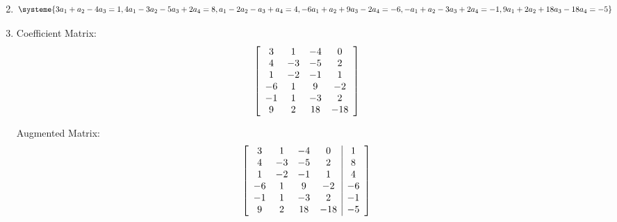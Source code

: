 \documentclass{article}
\begin{document}
\begin{enumerate}[label = \textbf{\alph*)}]
\begin{align*}
		\end{align*}
	\item
		\[
		\systeme{
			3a_1 + a_2 - 4a_3 = 1,
			4a_1 - 3a_2 - 5a_3 + 2a_4 = 8,
			a_1 - 2a_2 - a_3 + a_4 = 4,
			-6a_1 + a_2 + 9a_3 - 2a_4 = -6,
			-a_1 + a_2 - 3a_3 + 2a_4 = -1,
			9a_1 + 2a_2 + 18a_3 - 18a_4 = -5
		}
		\]
	\item
		Coefficient Matrix:
		\begin{align*}
			\left[
			\begin{array}{ c c c c }
				3 & 1 & -4 & 0 \\
				4 & -3 & -5 & 2 \\
				1 & -2 & -1 & 1 \\
				-6 & 1 & 9 & -2 \\
				-1 & 1 & -3 & 2 \\
				9 & 2 & 18 & -18
			\end{array}
			\right]
		\end{align*}

		Augmented Matrix:
		\begin{align*}
			\left[
			\begin{array}{ c c c c | c }
				3 & 1 & -4 & 0 & 1 \\
				4 & -3 & -5 & 2 & 8 \\
				1 & -2 & -1 & 1 & 4 \\
				-6 & 1 & 9 & -2 & -6 \\
				-1 & 1 & -3 & 2 & -1 \\
				9 & 2 & 18 & -18 & -5
			\end{array}
			\right]
		\end{align*}
\end{enumerate}
\end{document}

